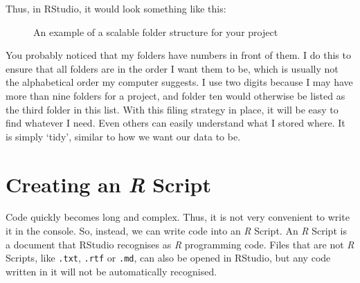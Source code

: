 \documentclass[
  letterpaper,
]{krantz}
\begin{document}
Thus, in RStudio, it would look something like this:

\begin{figure}


\caption{\label{fig-folder-structure}An example of a scalable folder
structure for your project}

\end{figure}%

You probably noticed that my folders have numbers in front of them. I do
this to ensure that all folders are in the order I want them to be,
which is usually not the alphabetical order my computer suggests. I use
two digits because I may have more than nine folders for a project, and
folder ten would otherwise be listed as the third folder in this list.
With this filing strategy in place, it will be easy to find whatever I
need. Even others can easily understand what I stored where. It is
simply `tidy', similar to how we want our data to be.

\section{\texorpdfstring{Creating an \emph{R}
Script}{Creating an R Script}}\label{creating-an-r-script}

Code quickly becomes long and complex. Thus, it is not very convenient
to write it in the console. So, instead, we can write code into an
\emph{R} Script. An \emph{R} Script is a document that RStudio
recognises as \emph{R} programming code. Files that are not \emph{R}
Scripts, like \texttt{.txt}, \texttt{.rtf} or \texttt{.md}, can also be
opened in RStudio, but any code written in it will not be automatically
recognised.
\end{document}
